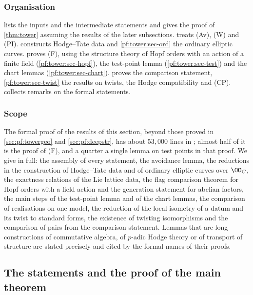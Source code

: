 \subsubsection*{Organisation}
 lists the inputs and the intermediate statements and gives the proof of
\cref{thm:tower} assuming the results of the later subsections.  treats (Av), (W) and
(PI).  constructs Hodge--Tate data and \cref{pf:tower:sec-ord} the ordinary
elliptic curves.  proves (F), using the structure theory of Hopf orders with an action of a
finite field (\cref{pf:tower:sec-hopf}), the test-point lemma (\cref{pf:tower:sec-test}) and the chart lemmas
(\cref{pf:tower:sec-chart}).  proves the comparison statement,
\cref{pf:tower:sec-twist} the results on twists, the Hodge compatibility and (CP).
 collects remarks on the formal statements.

\subsubsection*{Scope}
The formal proof of the results of this section, beyond those proved in \cref{sec:pf:towergeo} and
\cref{sec:pf:deepstr}, has about $53{,}000$ lines in \cite{LeanSource2026}; almost half of it is the proof of (F), and
a quarter a single lemma on test points in that proof. We give in full: the assembly of every statement, the avoidance
lemma, the reductions in the construction of Hodge--Tate data and of ordinary elliptic curves over $\OO_C$, the
exactness relations of the Lie lattice data, the flag comparison theorem for Hopf orders with a field action and the
generation statement for abelian factors, the main steps of the test-point lemma and of the chart lemmas, the comparison
of realisations on one model, the reduction of the local isometry of a datum and its twist to standard forms, the existence
of twisting isomorphisms and the comparison of pairs from the comparison statement. Lemmas that are long constructions of
commutative algebra, of $p$-adic Hodge theory or of transport of structure are stated precisely and cited by the formal
names of their proofs.

\subsection{The statements and the proof of the main theorem}\label{pf:tower:sec-statements}


